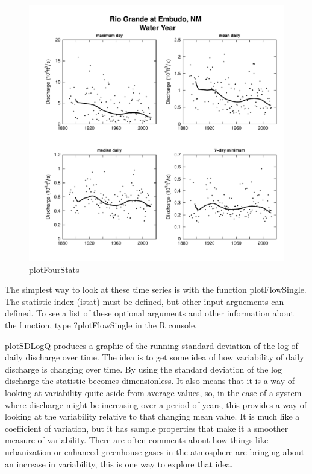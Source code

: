 \documentclass[a4paper,11pt]{article}\usepackage{graphicx, color}
\newenvironment{knitrout}{}{} %
\begin{document}
\begin{knitrout}
\color{fgcolor}\begin{figure}[]

\includegraphics[width=1\linewidth,height=1\linewidth]{figure/plotFourStats} \caption[plotFourStats]{plotFourStats\label{fig:plotFourStats}}
\end{figure}


\end{knitrout}



\FloatBarrier

The simplest way to look at these time series is with the function plotFlowSingle. The statistic index (istat) must be defined, but other input arguements can defined. To see a list of these optional arguments and other information about the function, type ?plotFlowSingle in the R console. 

plotSDLogQ produces a graphic of the running standard deviation of the log of daily discharge over time.  The idea is to get some idea of how variability of daily discharge is changing over time.  By using the standard deviation of the log discharge the statistic becomes dimensionless.  It also means that it is a way of looking at variability quite aside from average values, so, in the case of a system where discharge might be increasing over a period of years, this provides a way of looking at the variability relative to that changing mean value.  It is much like a coefficient of variation, but it has sample properties that make it a smoother measure of variability.  There are often comments about how things like urbanization or enhanced greenhouse gases in the atmosphere are bringing about an increase in variability, this is one way to explore that idea.
\end{document}
